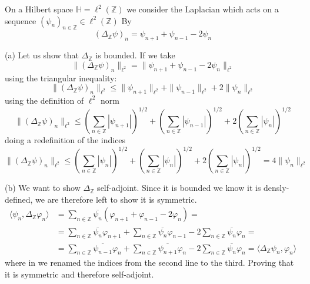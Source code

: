 \documentclass{article}
\newcommand{\Z}{\mathbb{Z}}
\begin{document}
On a Hilbert space $\mathbb H = \ell^2 (\Z)$ we consider the Laplacian which acts on a sequence ${(\psi_n)}_{n \in \Z}  \in \ell^2 (\Z)$ By
\[
    {(\Delta_\Z \psi)}_n = \psi_{n+1} + \psi_{n-1} -2 \psi_n
\]

(a) Let us show that $\Delta_\Z$ is bounded. If we take
\[
    \| {(\Delta_\Z \psi)}_n \|_{\ell^2} = \| \psi_{n+1} + \psi_{n-1} -2 \psi_n \|_{\ell^2}
\]
using the triangular inequality:
\[
    \| {(\Delta_\Z \psi)}_n \|_{\ell^2} \leq \| \psi_{n+1}\|_{\ell^2} + \|\psi_{n-1}\|_{\ell^2} + 2\|\psi_n \|_{\ell^2}
\]
using the definition of $\ell^2$ norm
\[
    \| {(\Delta_\Z \psi)}_n \|_{\ell^2} \leq {\left( \sum_{n \in \Z} |\psi_{n+1}| \right)}^{1 / 2} + {\left( \sum_{n \in \Z} |\psi_{n-1}| \right)}^{1 / 2} + 2{\left( \sum_{n \in \Z} |\psi_{n}| \right)}^{1 / 2}
\]
doing a redefinition of the indices
\[
    \| {(\Delta_\Z \psi)}_n \|_{\ell^2} \leq {\left( \sum_{n \in \Z} |\psi_{n}| \right)}^{1 / 2} + {\left( \sum_{n \in \Z} |\psi_{n}| \right)}^{1 / 2} + 2{\left( \sum_{n \in \Z} |\psi_{n}| \right)}^{1 / 2} = 4 \| \psi_n \|_{\ell^2}
\]

(b) We want to show $\Delta_\Z$ self-adjoint. Since it is bounded we know it is densly-defined, we are therefore left to show it is symmetric.
\[
    \begin{split}
        \langle \psi_n, \Delta_\Z \varphi_n \rangle &= \sum_{n \in \Z} \overline{\psi_n} (\varphi_{n+1} + \varphi_{n-1} -2 \varphi_n) = \\
        & = \sum_{n \in \Z} \overline{\psi_n} \varphi_{n+1} + \sum_{n \in \Z} \overline{\psi_n} \varphi_{n-1} - 2 \sum_{n \in \Z} \overline{\psi_n} \varphi_n = \\
        & = \sum_{n \in \Z} \overline{\psi_{n-1}} \varphi_{n} + \sum_{n \in \Z} \overline{\psi_{n+1}} \varphi_{n} - 2 \sum_{n \in \Z} \overline{\psi_n} \varphi_n = \langle \Delta_\Z \psi_n, \varphi_n \rangle
    \end{split}
\]
where in we renamed the indices from the second line to the third. Proving that it is symmetric and therefore self-adjoint.
\end{document}

